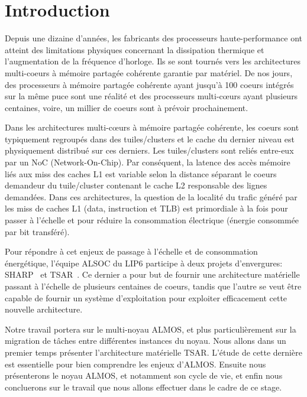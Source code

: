 \chapter{Introduction}

  Depuis une dizaine d’années, les fabricants des processeurs haute-performance
  ont atteint des limitations physiques concernant la dissipation thermique et
  l'augmentation de la fréquence d'horloge. Ils se sont tournés vers les
  architectures multi-coeurs à mémoire partagée cohérente garantie par
  matériel. De nos jours, des processeurs à mémoire partagée cohérente ayant
  jusqu’à 100 coeurs intégrés sur la même puce sont une réalité et des
  processeurs multi-c\oe urs ayant plusieurs centaines, voire, un millier de
  coeurs sont à prévoir prochainement.
  
  Dans les architectures multi-c\oe urs à mémoire partagée cohérente, les coeurs
  sont typiquement regroupés dans des tuiles/clusters et le cache du dernier
  niveau est physiquement distribué sur ces derniers. Les tuiles/clusters sont
  reliés entre-eux par un NoC (Network-On-Chip). Par conséquent, la latence des
  accès mémoire liés aux miss des caches L1 est variable selon la distance
  séparant le coeurs demandeur du tuile/cluster contenant le cache L2
  responsable des lignes demandées. Dans ces architectures, la question de la
  localité du trafic généré par les miss de caches L1 (data, instruction et TLB)
  est primordiale à la fois pour passer à l’échelle et pour réduire la
  consommation électrique (énergie consommée par bit transféré).

  Pour répondre à cet enjeux de passage à l'échelle et de consommation
  énergétique, l'équipe ALSOC du LIP6 participe à deux projets d'envergures:
  SHARP~\cite{sharp2012} et TSAR~\cite{tsar2008}. Ce dernier a pour but de
  fournir une architecture matérielle passant à l'échelle de plusieurs centaines
  de coeurs, tandis que l'autre se veut être capable de fournir un système
  d'exploitation pour exploiter efficacement cette nouvelle architecture.

  Notre travail portera sur le multi-noyau ALMOS, et plus particulièrement sur
  la migration de tâches entre différentes instances du noyau. Nous allons dans
  un premier temps présenter l'architecture matérielle TSAR. L'étude de cette
  dernière est essentielle pour bien comprendre les enjeux d'ALMOS. Ensuite nous
  présenterons le noyau ALMOS, et notamment son cycle de vie, et enfin nous
  concluerons sur le travail que nous allons effectuer dans le cadre de ce
  stage.
  

